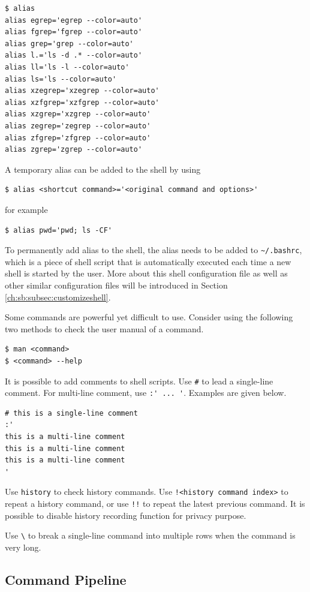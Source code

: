 \begin{lstlisting}
$ alias
alias egrep='egrep --color=auto'
alias fgrep='fgrep --color=auto'
alias grep='grep --color=auto'
alias l.='ls -d .* --color=auto'
alias ll='ls -l --color=auto'
alias ls='ls --color=auto'
alias xzegrep='xzegrep --color=auto'
alias xzfgrep='xzfgrep --color=auto'
alias xzgrep='xzgrep --color=auto'
alias zegrep='zegrep --color=auto'
alias zfgrep='zfgrep --color=auto'
alias zgrep='zgrep --color=auto'
\end{lstlisting}
A temporary alias can be added to the shell by using
\begin{lstlisting}
$ alias <shortcut command>='<original command and options>'
\end{lstlisting}
for example
\begin{lstlisting}
$ alias pwd='pwd; ls -CF'
\end{lstlisting}
To permanently add alias to the shell, the alias needs to be added to \verb|~/.bashrc|, which is a piece of shell script that is automatically executed each time a new shell is started by the user. More about this shell configuration file as well as other similar configuration files will be introduced in Section \ref{ch:sb:subsec:customizeshell}.

Some commands are powerful yet difficult to use. Consider using the following two methods to check the user manual of a command.
\begin{lstlisting}
$ man <command>
$ <command> --help
\end{lstlisting}

It is possible to add comments to shell scripts. Use \verb|#| to lead a single-line comment. For multi-line comment, use \verb|:' ... '|. Examples are given below.
\begin{lstlisting}
# this is a single-line comment
:'
this is a multi-line comment
this is a multi-line comment
this is a multi-line comment
'
\end{lstlisting}

Use \verb|history| to check history commands. Use \verb|!<history command index>| to repeat a history command, or use \verb|!!| to repeat the latest previous command. It is possible to disable history recording function for privacy purpose.

Use \verb|\| to break a single-line command into multiple rows when the command is very long.

\subsection{Command Pipeline}

